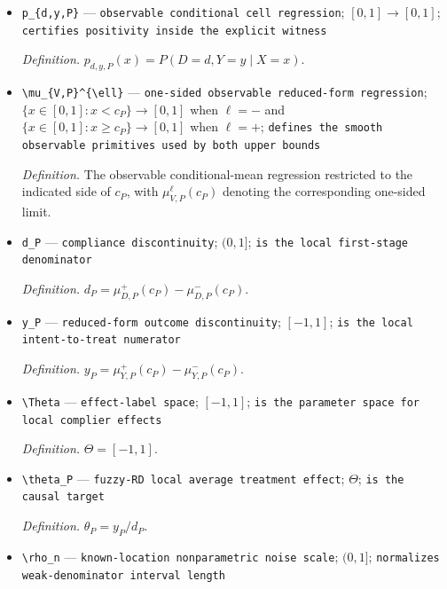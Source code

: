 \documentclass{article}
\begin{document}
\begin{itemize}
  \item \texttt{p\_\allowbreak{}\{d,\allowbreak{}y,\allowbreak{}P\}\allowbreak{}} --- \texttt{observable conditional cell regression}; \([0,1]\to[0,1]\); \texttt{certifies positivity inside the explicit witness}
  \par\smallskip\noindent\emph{Definition.} \(p_{d,y,P}(x)=P(D=d,Y=y\mid X=x)\).
  \item \texttt{\textbackslash{}\allowbreak{}mu\_\allowbreak{}\{V,\allowbreak{}P\}\allowbreak{}\textasciicircum{}\{\textbackslash{}\allowbreak{}ell\}\allowbreak{}} --- \texttt{one-\allowbreak{}sided observable reduced-\allowbreak{}form regression}; \(\{x\in[0,1]:x<c_P\}\to[0,1]\) when \(\ell=-\) and \(\{x\in[0,1]:x\ge c_P\}\to[0,1]\) when \(\ell=+\); \texttt{defines the smooth observable primitives used by both upper bounds}
  \par\smallskip\noindent\emph{Definition.} The observable conditional-mean regression restricted to the indicated side of \(c_P\), with \(\mu_{V,P}^{\ell}(c_P)\) denoting the corresponding one-sided limit.
  \item \texttt{d\_\allowbreak{}P} --- \texttt{compliance discontinuity}; \((0,1]\); \texttt{is the local first-\allowbreak{}stage denominator}
  \par\smallskip\noindent\emph{Definition.} \(d_P=\mu_{D,P}^{+}(c_P)-\mu_{D,P}^{-}(c_P)\).
  \item \texttt{y\_\allowbreak{}P} --- \texttt{reduced-\allowbreak{}form outcome discontinuity}; \([-1,1]\); \texttt{is the local intent-\allowbreak{}to-\allowbreak{}treat numerator}
  \par\smallskip\noindent\emph{Definition.} \(y_P=\mu_{Y,P}^{+}(c_P)-\mu_{Y,P}^{-}(c_P)\).
  \item \texttt{\textbackslash{}\allowbreak{}Theta} --- \texttt{effect-\allowbreak{}label space}; \([-1,1]\); \texttt{is the parameter space for local complier effects}
  \par\smallskip\noindent\emph{Definition.} \(\Theta=[-1,1]\).
  \item \texttt{\textbackslash{}\allowbreak{}theta\_\allowbreak{}P} --- \texttt{fuzzy-\allowbreak{}RD local average treatment effect}; \(\Theta\); \texttt{is the causal target}
  \par\smallskip\noindent\emph{Definition.} \(\theta_P=y_P/d_P\).
  \item \texttt{\textbackslash{}\allowbreak{}rho\_\allowbreak{}n} --- \texttt{known-\allowbreak{}location nonparametric noise scale}; \((0,1]\); \texttt{normalizes weak-\allowbreak{}denominator interval length}

\end{itemize}
\end{document}
